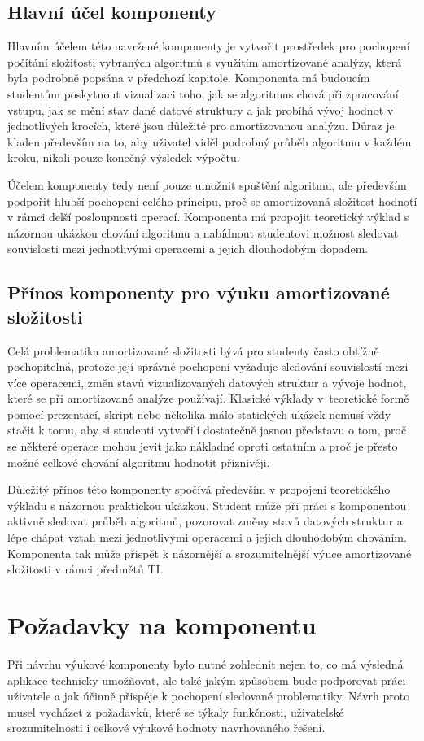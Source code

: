 \subsection{Hlavní účel komponenty}
Hlavním účelem této navržené komponenty je vytvořit prostředek pro pochopení počítání složitosti vybraných algoritmů s využitím amortizované analýzy, která byla podrobně popsána v předchozí kapitole. Komponenta má budoucím studentům poskytnout vizualizaci toho, jak se algoritmus chová při zpracování vstupu, jak se mění stav dané datové struktury a jak probíhá vývoj hodnot v jednotlivých krocích, které jsou důležité pro amortizovanou analýzu. Důraz je kladen především na to, aby uživatel viděl podrobný průběh algoritmu v každém kroku, nikoli pouze konečný výsledek výpočtu.

Účelem komponenty tedy není pouze umožnit spuštění algoritmu, ale především podpořit hlubší pochopení celého principu, proč se amortizovaná složitost hodnotí v rámci delší posloupnosti operací. Komponenta má propojit teoretický výklad s názornou ukázkou chování algoritmu a nabídnout studentovi možnost sledovat souvislosti mezi jednotlivými operacemi a jejich dlouhodobým dopadem.

\subsection{Přínos komponenty pro výuku amortizované složitosti}
Celá problematika amortizované složitosti bývá pro studenty často obtížně pochopitelná, protože její správné pochopení vyžaduje sledování souvislostí mezi více operacemi, změn stavů vizualizovaných datových struktur a vývoje hodnot, které se při amortizované analýze používají. Klasické výklady v~teoretické formě pomocí prezentací, skript nebo několika málo statických ukázek nemusí vždy stačit k tomu, aby si studenti vytvořili dostatečně jasnou představu o tom, proč se některé operace mohou jevit jako nákladné oproti ostatním a proč je přesto možné celkové chování algoritmu hodnotit příznivěji.

Důležitý přínos této komponenty spočívá především v propojení teoretického výkladu s názornou praktickou ukázkou. Student může při práci s komponentou aktivně sledovat průběh algoritmů, pozorovat změny stavů datových struktur a lépe chápat vztah mezi jednotlivými operacemi a jejich dlouhodobým chováním. Komponenta tak může přispět k názornější a srozumitelnější výuce amortizované složitosti v rámci předmětů TI.


\section{Požadavky na komponentu}
Při návrhu výukové komponenty bylo nutné zohlednit nejen to, co má výsledná aplikace technicky umožňovat, ale také jakým způsobem bude podporovat práci uživatele a jak účinně přispěje k pochopení sledované problematiky. Návrh proto musel vycházet z požadavků, které se týkaly funkčnosti, uživatelské srozumitelnosti i celkové výukové hodnoty navrhovaného řešení.

